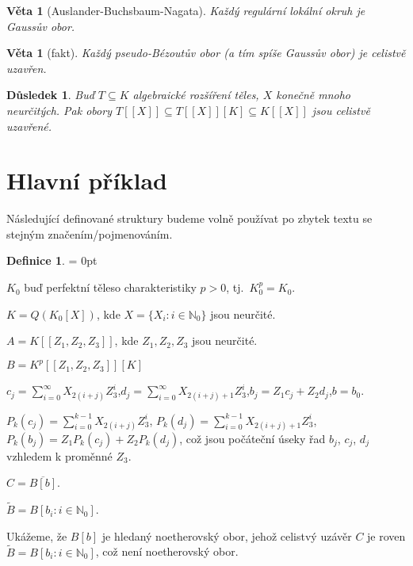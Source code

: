\documentclass[11pt,a4paper]{article}
\newcommand\m[1]{\mathbb { #1 }} %
\newcommand\N{\m N}
\let \icl \overline %
\newenvironment{items}{%
	\itemize
	\itemsep = 0pt%
}{%
	\enditemize
}
\newcounter{numb}
\theoremstyle{definition}
\newtheorem*{definice}{Definice}
\theoremstyle{plain}
\newtheorem{veta}[numb]{Věta}
\newtheorem{dusledek}[numb]{Důsledek}
\begin{document}
\begin{veta}[Auslander-Buchsbaum-Nagata]
	Každý regulární lokální okruh je Gaussův obor.
\end{veta}

\begin{veta}[fakt]
	Každý pseudo-Bézoutův obor (a tím spíše Gaussův obor) je celistvě uzavřen.
\end{veta}

\begin{dusledek} \label{thm:icl}
	Buď $T \subseteq K$ algebraické rozšíření těles, $X$ konečně mnoho neurčitých. Pak obory $T[[X]] \subseteq T[[X]][K] \subseteq K[[X]]$ jsou celistvě uzavřené.
\end{dusledek}


\section{Hlavní příklad}

Následující definované struktury budeme volně používat po zbytek textu se stejným značením/pojmenováním.

\begin{definice} \hfill
	\newcommand*{\I}{_{i = 0}^\infty}
	\newcommand*{\PI}{_{i = 0}^{k - 1}}

	\begin{items}
		\item $K_0$ buď perfektní těleso charakteristiky $p > 0$, tj.\ $K_0^p = K_0$.
		\item $K = Q(K_0[X])$, kde $X = \{X_i: i \in \N_0\}$ jsou neurčité.
		\item $A = K[[Z_1, Z_2, Z_3]]$, kde $Z_1, Z_2, Z_3$ jsou neurčité.
		\item $B = K^p[[Z_1, Z_2, Z_3]][K]$
		\item $c_j = \sum\I X_{2(i + j)} Z_3^i$,\quad $d_j = \sum\I X_{2(i + j) + 1} Z_3^i$,\quad $b_j = Z_1 c_j + Z_2 d_j$,\quad $b = b_0$.
		\item $P_k(c_j) = \sum\PI X_{2(i + j)} Z_3^i$, $P_k(d_j) = \sum\PI X_{2(i + j) + 1} Z_3^i$, $P_k(b_j) = Z_1 P_k(c_j) + Z_2 P_k(d_j)$, což jsou počáteční úseky řad $b_j$, $c_j$, $d_j$ vzhledem k proměnné $Z_3$.
		\item $C = \icl{B[b]}$.
		\item $\tilde{B} = B[b_i: i \in \N_0]$.
	\end{items}
\end{definice}

Ukážeme, že $B[b]$ je hledaný noetherovský obor, jehož celistvý uzávěr $C$ je roven $\tilde{B} = B[b_i: i \in \N_0]$, což není noetherovský obor.
\end{document}
